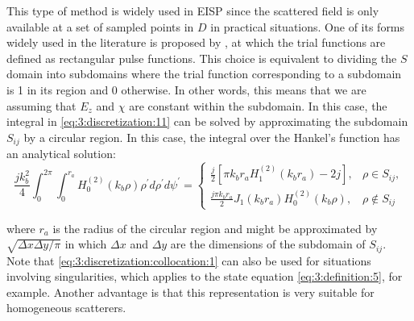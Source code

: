 			This type of method is widely used in EISP since the scattered field is only available at a set of sampled points in $D$ in practical situations. One of its forms widely used in the literature is proposed by \cite{richmond1965scattering}, at which the trial functions are defined as rectangular pulse functions. This choice is equivalent to dividing the $S$ domain into subdomains where the trial function corresponding to a subdomain is 1 in its region and 0 otherwise. In other words, this means that we are assuming that $E_z$ and $\chi$ are constant within the subdomain. In this case, the integral in \eqref{eq:3:discretization:11} can be solved by approximating the subdomain $S_{ij}$ by a circular region. In this case, the integral over the Hankel's function has an analytical solution:
			\begin{equation}
				\frac{jk^2_b}{4} \int_0^{2\pi}\int_0^{r_a} H^{(2)}_0(k_b\rho)\rho^\prime d\rho^\prime d\psi^\prime = \begin{cases}
																																									      \frac{j}{2}\left[ \pi k_br_a H^{(2)}_1(k_br_a) -2j \right], & \rho\in S_{ij}, \\
																																									      \frac{j\pi k_b r_a}{2} J_1(k_br_a) H^{(2)}_0(k_b\rho), & \rho\notin S_{ij}
																																								      \end{cases} \label{eq:3:discretization:collocation:1}
			\end{equation}
			
			\noindent where $r_a$ is the radius of the circular region and might be approximated by $\sqrt{\Delta x\Delta y/\pi}$ in which $\Delta x$ and $\Delta y$ are the dimensions of the subdomain of $S_{ij}$. Note that \eqref{eq:3:discretization:collocation:1} can also be used for situations involving singularities, which applies to the state equation \eqref{eq:3:definition:5}, for example. Another advantage is that this representation is very suitable for homogeneous scatterers.
			
